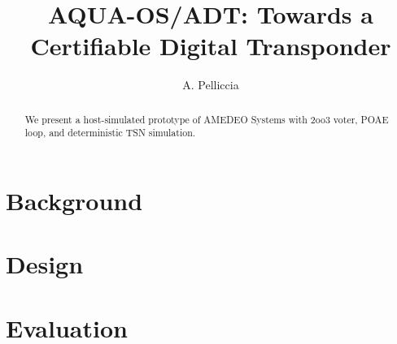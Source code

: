 \documentclass[conference]{IEEEtran}
\begin{document}
\title{AQUA-OS/ADT: Towards a Certifiable Digital Transponder}
\author{A. Pelliccia}
\maketitle
\begin{abstract}
We present a host-simulated prototype of AMEDEO Systems with 2oo3 voter, POAE loop, and deterministic TSN simulation.
\end{abstract}
\section{Background}
\section{Design}
\section{Evaluation}


\end{document}
